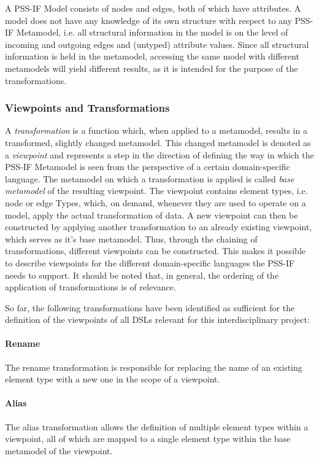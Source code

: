 A PSS-IF Model consists of nodes and edges, both of which have attributes. A model does not have any knowledge of its own structure with respect to any PSS-IF Metamodel, i.e. all structural information in the model is on the level of incoming and outgoing edges and (untyped) attribute values. Since all structural information is held in the metamodel, accessing the same model with different metamodels will yield different results, as it is intended for the purpose of the transformations.

\subsubsection{Viewpoints and Transformations}

A \textit{transformation} is a function which, when applied to a metamodel, results in a transformed, slightly changed metamodel. This changed metamodel is denoted as a \textit{viewpoint} and represents a step in the direction of defining the way in which the PSS-IF Metamodel is seen from the perspective of a certain domain-specific language. The metamodel on which a transformation is applied is called \textit{base metamodel} of the resulting viewpoint. The viewpoint contains element types, i.e. node or edge Types, which, on demand, whenever they are used to operate on a model, apply the actual transformation of data. A new viewpoint can then be constructed by applying another transformation to an already existing viewpoint, which serves as it's base metamodel. Thus, through the chaining of transformations, different viewpoints can be constructed. This makes it possible to describe viewpoints for the different domain-specific languages the PSS-IF needs to support. It should be noted that, in general, the ordering of the application of transformations is of relevance. 

So far, the following transformations have been identified as sufficient for the definition of the viewpoints of all DSLs relevant for this interdisciplinary project:

\paragraph{Rename} The rename transformation is responsible for replacing the name of an existing element type with a new one in the scope of a viewpoint.

\paragraph{Alias} The alias transformation allows the definition of multiple element types within a viewpoint, all of which are mapped to a single element type within the base metamodel of the viewpoint.

